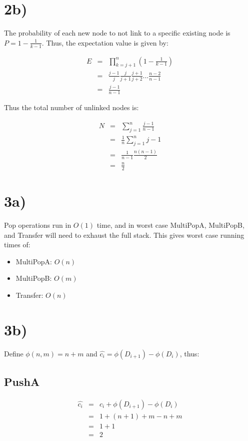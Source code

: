 \documentclass[a4paper,11pt]{article}
\begin{document}
\section*{2b)}
The probability of each new node to not link to a specific existing
node is $P = 1-\frac{1}{k-1}$.  Thus, the expectation value is given by:

\begin{eqnarray}
E &=& \prod_{k=j+1}^{n} (1-\frac{1}{k-1}) \\
&=& \frac{j-1}{j} \frac{j}{j+1} \frac{j+1}{j+2} ... \frac{n-2}{n-1} \\
&=& \frac{j-1}{n-1}
\end{eqnarray}

Thus the total number of unlinked nodes is:

\begin{eqnarray}
N &=& \sum_{j=1}^{n} \frac{j-1}{n-1} \\
&=& \frac{1}{n} \sum_{j=1}^{n} j-1 \\
&=& \frac{1}{n-1} \frac{n(n-1)}{2} \\
&=& \frac{n}{2} 
\end{eqnarray}


\section*{3a)}
Pop operations run in $O(1)$ time, and in worst case MultiPopA, MultiPopB,
and Transfer will need to exhaust the full stack.  This gives worst case
running times of:

\begin{itemize}
  \item MultiPopA: $O(n)$
  \item MultiPopB: $O(m)$
  \item Transfer: $O(n)$
\end{itemize}

\section*{3b)}
Define $\phi(n, m) = n + m$ and $\hat{c_{i}} = \phi(D_{i+1}) - \phi(D_{i})$, thus:

\subsection*{PushA}
\begin{eqnarray}
\hat{c_{i}} &=& c_{i} + \phi(D_{i+1}) - \phi(D_{i}) \\
&=& 1 + (n+1) + m - n + m \\ 
&=& 1 + 1 \\
&=& 2
\end{eqnarray}
\end{document}
